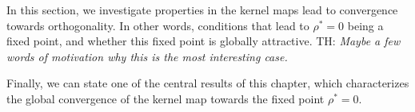 \documentclass[twoside]{article}
\newtheorem{remark}{Remark}
\theoremstyle{definition}
\newtheorem{definition}{Definition}
\newcommand{\thomas}[1]{{\color{blue}TH:  \textit{#1}}}
\begin{document}
In this section, we investigate properties in the kernel maps lead to convergence towards orthogonality. In other words, conditions that lead to $\rho^*=0$ being a fixed point, and whether this fixed point is globally attractive. \thomas{Maybe a few words of motivation why this is the most interesting case.}








Finally, we can state one of the central results of this chapter, which characterizes the global convergence of the kernel map towards the fixed point $\rho^*=0.$
\end{document}
